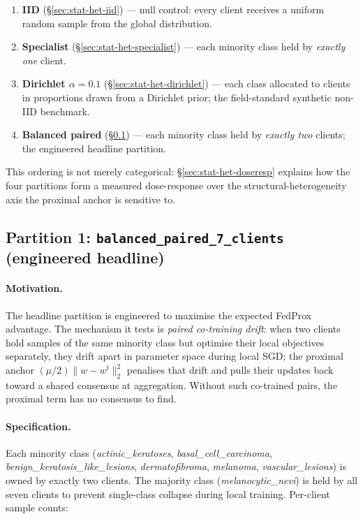 \begin{enumerate}
  \item \textbf{IID} (\S\ref{sec:stat-het-iid}) — null control:
        every client receives a uniform random sample from the global
        distribution.
  \item \textbf{Specialist} (\S\ref{sec:stat-het-specialist}) —
        each minority class held by \emph{exactly one} client.
  \item \textbf{Dirichlet $\alpha = 0.1$}
        (\S\ref{sec:stat-het-dirichlet}) — each class allocated to
        clients in proportions drawn from a Dirichlet prior; the
        field-standard synthetic non-IID benchmark.
  \item \textbf{Balanced paired} (\S\ref{sec:stat-het-paired}) —
        each minority class held by \emph{exactly two} clients;
        the engineered headline partition.
\end{enumerate}

This ordering is not merely categorical: \S\ref{sec:stat-het-doseresp}
explains how the four partitions form a measured dose-response over
the structural-heterogeneity axis the proximal anchor is sensitive to.

\subsection{Partition 1: \texttt{balanced\_paired\_7\_clients}
            (engineered headline)}
\label{sec:stat-het-paired}

\paragraph{Motivation.}
The headline partition is engineered to maximise the expected
FedProx advantage. The mechanism it tests is \emph{paired
co-training drift}: when two clients hold samples of the same
minority class but optimise their local objectives separately, they
drift apart in parameter space during local SGD; the proximal anchor
$(\mu/2)\lVert w - w^t\rVert_2^2$ penalises that drift and pulls
their updates back toward a shared consensus at aggregation. Without
such co-trained pairs, the proximal term has no consensus to find.

\paragraph{Specification.}
Each minority class (\emph{actinic\_keratoses}, \emph{basal\_cell\_carcinoma},
\emph{benign\_keratosis\_like\_lesions}, \emph{dermatofibroma},
\emph{melanoma}, \emph{vascular\_lesions}) is owned by exactly two
clients. The majority class (\emph{melanocytic\_nevi}) is held by
all seven clients to prevent single-class collapse during local
training. Per-client sample counts:

